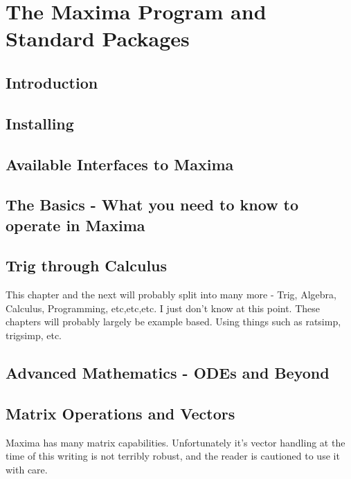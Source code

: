 \documentclass[oneside,english]{book}
\begin{document}
\part{The Maxima Program and Standard Packages}

\chapter{Introduction}
  

\chapter{Installing}
  

\chapter{Available Interfaces to Maxima}
  

\chapter{The Basics - What you need to know to operate in Maxima}
  

\chapter{Trig through Calculus}

    This chapter and the next will probably split into many more - Trig,
    Algebra, Calculus, Programming, etc,etc,etc. I just don't know at
    this point. These chapters will probably largely be example based.
    Using things such as ratsimp, trigsimp, etc.
   
   
 
\chapter{Advanced Mathematics - ODEs and Beyond}

   

\chapter{Matrix Operations and Vectors}

    Maxima has many matrix capabilities. Unfortunately it's vector handling
    at the time of this writing is not terribly robust, and the reader
    is cautioned to use it with care.
\end{document}
